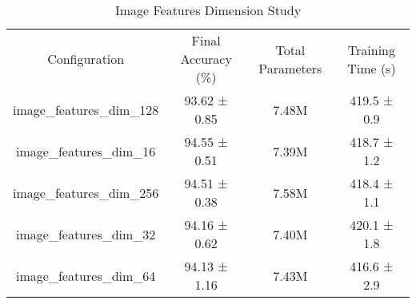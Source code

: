 \begin{table}
    \centering
    \begin{tabular}{cccc}
        Configuration & Final Accuracy (\%) & Total Parameters & Training Time (s) \\
        image_features_dim_128 & 93.62 ± 0.85 & 7.48M & 419.5 ± 0.9 \\
        image_features_dim_16 & 94.55 ± 0.51 & 7.39M & 418.7 ± 1.2 \\
        image_features_dim_256 & 94.51 ± 0.38 & 7.58M & 418.4 ± 1.1 \\
        image_features_dim_32 & 94.16 ± 0.62 & 7.40M & 420.1 ± 1.8 \\
        image_features_dim_64 & 94.13 ± 1.16 & 7.43M & 416.6 ± 2.9 \\
    \end{tabular}
    \caption{Image Features Dimension Study}
    \label{tab:image_features_dim}
\end{table}